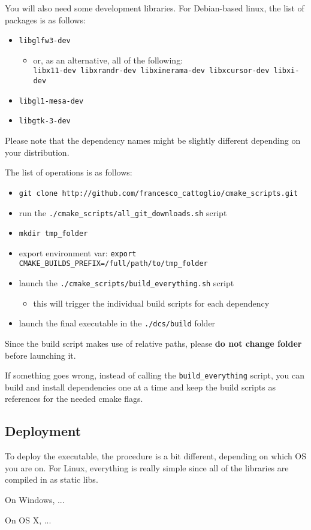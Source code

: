 You will also need some development libraries. For Debian-based linux, the list of packages is as follows:
\begin{itemize}
    \item \texttt{libglfw3-dev}
    \begin{itemize}
        \item  or, as an alternative, all of the following: \\
            \verb|libx11-dev libxrandr-dev libxinerama-dev libxcursor-dev libxi-dev|
    \end{itemize}
    \item \texttt{libgl1-mesa-dev}
    \item \texttt{libgtk-3-dev}
\end{itemize}
Please note that the dependency names might be slightly different depending on your distribution.

The list of operations is as follows:
\begin{itemize}
    \item \texttt{git clone http://github.com/francesco\_cattoglio/cmake\_scripts.git}
    \item run the \texttt{./cmake\_scripts/all\_git\_downloads.sh} script
    \item \texttt{mkdir tmp\_folder}
    \item export environment var: \texttt{export CMAKE\_BUILDS\_PREFIX=/full/path/to/tmp\_folder}
    \item launch the \texttt{./cmake\_scripts/build\_everything.sh} script
    \begin{itemize}
        \item this will trigger the individual build scripts for each dependency
    \end{itemize}
    \item launch the final executable in the \texttt{./dcs/build} folder
\end{itemize}
Since the build script makes use of relative paths, please \textbf{do not change folder} before launching it.

If something goes wrong, instead of calling the \texttt{build\_everything} script,
you can build and install dependencies one at a time and keep the build
scripts as references for the needed cmake flags.

\subsection{Deployment}
To deploy the executable, the procedure is a bit different, depending
on which OS you are on. For Linux, everything is really simple since
all of the libraries are compiled in as static libs.

On Windows, ...

On OS X, ...
